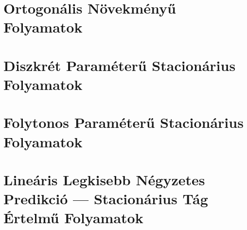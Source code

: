 \documentclass{article}
\begin{document}
\section{Ortogonális Növekményű Folyamatok}\label{sec:ortogonalisnovekmenyufolyamatok}
\section{Diszkrét Paraméterű Stacionárius Folyamatok}\label{sec:diszkretparameterustacionariusfolyamatok}
\section{Folytonos Paraméterű Stacionárius Folyamatok}\label{sec:folytonosparameterustacionariusfolyamatok}
\section{Lineáris Legkisebb Négyzetes Predikció --- Stacionárius Tág Értelmű Folyamatok}\label{sec:llsp}
\end{document}

